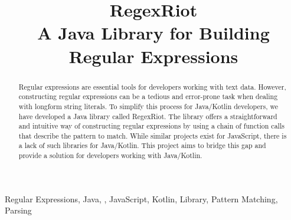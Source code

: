 \documentclass[conference]{IEEEtran}
\begin{document}
\title{RegexRiot \\A Java Library for Building Regular Expressions}

\author{
    \and
    \and

}


\maketitle

\begin{abstract}
    Regular expressions are essential tools for developers working with text data.
    However, constructing regular expressions can be a tedious and error-prone task when dealing with longform string literals.
    To simplify this process for Java/Kotlin developers, we have developed a Java library called RegexRiot.
    The library offers a straightforward and intuitive way of constructing regular expressions by using a chain of
    function calls that describe the pattern to match.
    While similar projects exist for JavaScript, there is a lack of such libraries for Java/Kotlin.
    This project aims to bridge this gap and provide a solution for developers working with Java/Kotlin.
\end{abstract}

\begin{IEEEkeywords}
    Regular Expressions, Java, , JavaScript, Kotlin, Library, Pattern Matching, Parsing
\end{IEEEkeywords}
\end{document}
